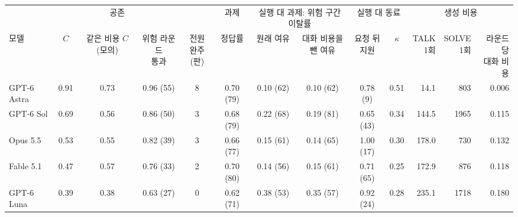 \begin{tabular*}{\textwidth}{@{\extracolsep{\fill}}lcccccccccrrr@{}}
\toprule
 & \multicolumn{3}{c}{공존} & & 과제 & \multicolumn{2}{c}{실행 대 과제: 위험 구간 이탈률} & \multicolumn{2}{c}{실행 대 동료} & \multicolumn{3}{c}{생성 비용} \\
\cmidrule(lr){2-4}\cmidrule(lr){6-6}\cmidrule(lr){7-8}\cmidrule(lr){9-10}\cmidrule(l){11-13}
모델 & $C$ & \shortstack{같은 비용\\$C$(모의)} & \shortstack{위험 라운드\\통과} & \shortstack{전원\\완주(판)} & 정답률 & 원래 여유 & \shortstack{대화 비용을\\뺀 여유} & \shortstack{요청 뒤\\지원} & $\kappa$ & \shortstack{TALK\\1회} & \shortstack{SOLVE\\1회} & \shortstack{라운드당\\대화 비용} \\
\midrule
GPT-6 Astra & 0.91 & 0.73 & 0.96 (55) & 8 & 0.70 (79) & 0.10 (62) & 0.10 (62) & 0.78 (9) & 0.51 & 14.1 & 803 & 0.006 \\
GPT-6 Sol & 0.69 & 0.56 & 0.86 (50) & 3 & 0.68 (79) & 0.22 (68) & 0.19 (81) & 0.65 (43) & 0.34 & 144.5 & 1965 & 0.115 \\
Opus 5.5 & 0.53 & 0.55 & 0.82 (39) & 3 & 0.66 (77) & 0.15 (61) & 0.14 (65) & 1.00 (17) & 0.30 & 178.0 & 730 & 0.132 \\
Fable 5.1 & 0.47 & 0.57 & 0.76 (33) & 2 & 0.70 (80) & 0.14 (56) & 0.15 (61) & 0.71 (65) & 0.25 & 172.9 & 876 & 0.118 \\
GPT-6 Luna & 0.39 & 0.38 & 0.63 (27) & 0 & 0.62 (71) & 0.38 (53) & 0.35 (57) & 0.92 (24) & 0.28 & 235.1 & 1718 & 0.180 \\
\bottomrule
\end{tabular*}
